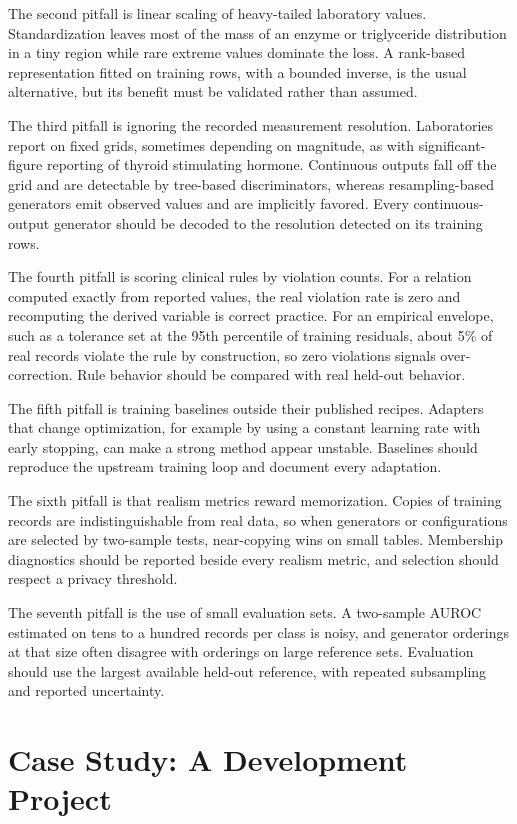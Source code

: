 \documentclass[conference]{IEEEtran}
\begin{document}
The second pitfall is linear scaling of heavy-tailed laboratory values. Standardization leaves most of the mass of an enzyme or triglyceride distribution in a tiny region while rare extreme values dominate the loss. A rank-based representation fitted on training rows, with a bounded inverse, is the usual alternative, but its benefit must be validated rather than assumed.

The third pitfall is ignoring the recorded measurement resolution. Laboratories report on fixed grids, sometimes depending on magnitude, as with significant-figure reporting of thyroid stimulating hormone. Continuous outputs fall off the grid and are detectable by tree-based discriminators, whereas resampling-based generators emit observed values and are implicitly favored. Every continuous-output generator should be decoded to the resolution detected on its training rows.

The fourth pitfall is scoring clinical rules by violation counts. For a relation computed exactly from reported values, the real violation rate is zero and recomputing the derived variable is correct practice. For an empirical envelope, such as a tolerance set at the 95th percentile of training residuals, about 5\% of real records violate the rule by construction, so zero violations signals over-correction. Rule behavior should be compared with real held-out behavior.

The fifth pitfall is training baselines outside their published recipes. Adapters that change optimization, for example by using a constant learning rate with early stopping, can make a strong method appear unstable. Baselines should reproduce the upstream training loop and document every adaptation.

The sixth pitfall is that realism metrics reward memorization. Copies of training records are indistinguishable from real data, so when generators or configurations are selected by two-sample tests, near-copying wins on small tables. Membership diagnostics should be reported beside every realism metric, and selection should respect a privacy threshold.

The seventh pitfall is the use of small evaluation sets. A two-sample AUROC estimated on tens to a hundred records per class is noisy, and generator orderings at that size often disagree with orderings on large reference sets. Evaluation should use the largest available held-out reference, with repeated subsampling and reported uncertainty.

\section{Case Study: A Development Project}
\end{document}
